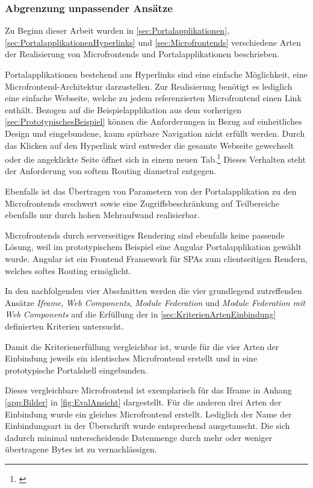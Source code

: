 \subsubsection{Abgrenzung unpassender Ansätze}\label{sec:Abgrenzung Ansaetze}

Zu Beginn dieser Arbeit wurden in \cref{sec:Portalapplikationen}, \cref{sec:PortalapplikationenHyperlinks} und \cref{sec:Microfrontends} verschiedene Arten der Realisierung von Microfrontends und Portalapplikationen beschrieben.

Portalapplikationen bestehend aus Hyperlinks sind eine einfache Möglichkeit, eine Microfrontend-Architektur darzustellen. Zur Realisierung benötigt es lediglich eine einfache Webseite, welche zu jedem referenzierten Microfrontend einen Link enthält. Bezogen auf die Beispielapplikation aus dem vorherigen \cref{sec:PrototypischesBeispiel} können die Anforderungen in Bezug auf einheitliches Design und eingebundene, kaum spürbare Navigation nicht erfüllt werden. Durch das Klicken auf den Hyperlink wird entweder die gesamte Webseite gewechselt oder die angeklickte Seite öffnet sich in einem neuen Tab.\footnote{\cite[vgl.][]{Steyer2018}} Dieses Verhalten steht der Anforderung von softem Routing diametral entgegen. 

Ebenfalls ist das Übertragen von Parametern von der Portalapplikation zu den Microfrontends erschwert sowie eine Zugriffsbeschränkung auf Teilbereiche ebenfalls nur durch hohen Mehraufwand realisierbar.

Microfrontends durch serverseitiges Rendering sind ebenfalls keine passende Lösung, weil im prototypischem Beispiel eine Angular Portalapplikation gewählt wurde. Angular ist ein Frontend Framework für \gls{SPA}s zum clientseitigen Rendern, welches softes Routing ermöglicht.

In den nachfolgenden vier Abschnitten werden die vier grundlegend zutreffenden Ansätze \textit{Iframe}, \textit{Web Components}, \textit{Module Federation} und \textit{Module Federation mit Web Components} auf die Erfüllung der in \cref{sec:KriterienArtenEinbindung} definierten Kriterien untersucht.

Damit die Kriterienerfüllung vergleichbar ist, wurde für die vier Arten der Einbindung jeweils ein identisches Microfrontend erstellt und in eine prototypische Portalshell eingebunden.

Dieses vergleichbare Microfrontend ist exemplarisch für das Iframe in Anhang \ref{app:Bilder} in \cref{fig:EvalAnsicht} dargestellt. Für die anderen drei Arten der Einbindung wurde ein gleiches Microfrontend erstellt. Lediglich der Name der Einbindungsart in der Überschrift wurde entsprechend ausgetauscht. Die sich dadurch minimal unterscheidende Datenmenge durch mehr oder weniger übertragene Bytes ist zu vernachlässigen.

